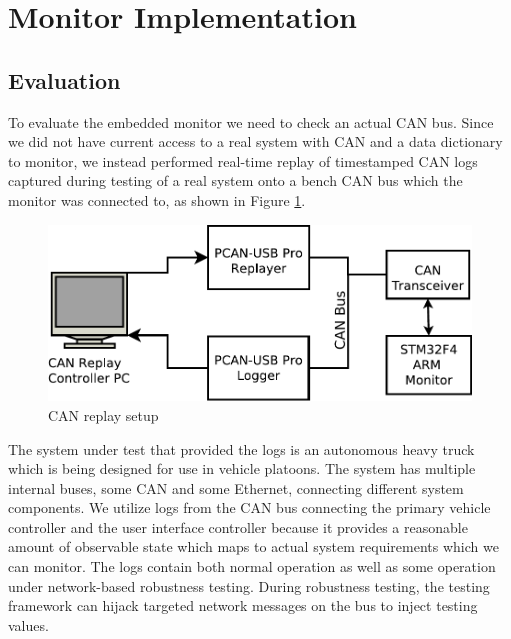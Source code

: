 
\section{Monitor Implementation}
\subsection{Evaluation}
\label{sec:eval:embedded}
To evaluate the embedded monitor we need to check an actual CAN bus.  
Since we did not have current access to a real system with CAN and a data dictionary to monitor, we instead performed real-time replay of timestamped CAN logs captured during testing of a real system onto a bench CAN bus which the monitor was connected to, as shown in Figure \ref{fig:eval:replaySchem}. 

\begin{figure}
\centering
\includegraphics[width=4.5in]{img/replay_arch}
\caption{CAN replay setup \label{fig:eval:replaySchem}}
\end{figure}
The system under test that provided the logs is an autonomous heavy truck which is being designed for use in vehicle platoons. %
The system has multiple internal buses, some CAN and some Ethernet, connecting different system components. We utilize logs from the CAN bus connecting the primary vehicle controller and the user interface controller because it provides a reasonable amount of observable state which maps to actual system requirements which we can monitor.
%
The logs contain both normal operation as well as some operation under network-based robustness testing. During robustness testing, the testing framework can hijack targeted network messages on the bus to inject testing values. %

